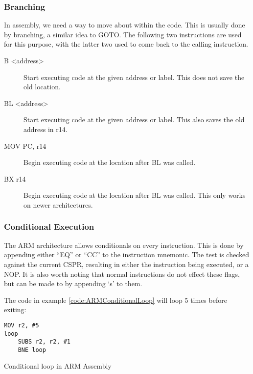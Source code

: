 			\subsubsection{Branching}
				In assembly, we need a way to move about within the code. 
				This is usually done by branching, a similar idea to GOTO. 
				The following two instructions are used for this purpose, with the latter two used to come back to the calling instruction. 
				\begin{description}
					\item[B <address>] Start executing code at the given address or label. 
						This does not save the old location. 
					\item[BL <address>] Start executing code at the given address or label. 
						This also saves the old address in r14. 
					\item[MOV PC, r14] Begin executing code at the location after BL was called. 
					\item[BX r14] Begin executing code at the location after BL was called. 
						This only works on newer architectures. 
				\end{description}

			\subsubsection{Conditional Execution}
				The ARM architecture allows conditionals on every instruction. 
				This is done by appending either ``EQ'' or ``CC'' to the instruction mnemonic. 
				The test is checked against the current CSPR, resulting in either the instruction being executed, or a NOP. 
				It is also worth noting that normal instructions do not effect these flags, but can be made to by appending `s' to them. 
				
				The code in example \ref{code:ARMConditionalLoop} will loop 5 times before exiting:
				\begin{code}
					\begin{lstlisting}[language={[ARM]assembler}]
	MOV r2, #5
loop
	SUBS r2, r2, #1
	BNE loop
					\end{lstlisting}
					\caption{Conditional loop in ARM Assembly}
					\label{code:ARMConditionalLoop}
				\end{code}

